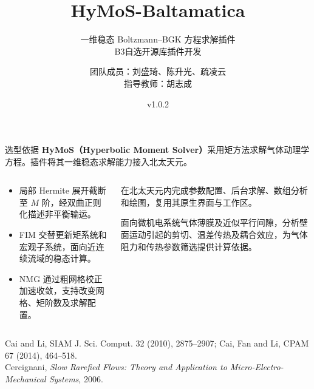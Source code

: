 \documentclass[aspectratio=1610]{ctexbeamer}
\title{HyMoS-Baltamatica}
\subtitle{\texorpdfstring{一维稳态 Boltzmann--BGK 方程求解插件\\[0.4em]
\normalsize B3\quad 自选开源库插件开发}{一维稳态 Boltzmann--BGK 方程求解插件}}
\author{\texorpdfstring{团队成员：刘盛琦、陈升光、疏凌云\\[0.5em]指导教师：胡志成}{刘盛琦、陈升光、疏凌云；指导教师：胡志成}}
\institute{南京航空航天大学}
\date{\small v1.0.2}
\newcommand{\refline}[1]{\par\vfill{\fontsize{7}{8.5}\selectfont\color{gray!85}#1}}
\newcommand{\subhead}[1]{\par\noindent{\color{structure.fg}\bfseries #1}\par\smallskip}
\begin{document}
\begin{frame}[plain]
\titlepage
\end{frame}

\begin{frame}{选型依据}
\textbf{HyMoS（Hyperbolic Moment Solver）}采用矩方法求解气体动理学方程。插件将其一维稳态求解能力接入北太天元。
\par\vspace{0.3cm}
\begin{columns}[T,onlytextwidth]
\begin{column}{0.49\textwidth}
\subhead{算法特点}
\begin{itemize}
\setlength\itemsep{0.6em}
\item 局部 Hermite 展开截断至 $M$ 阶，经双曲正则化描述非平衡输运。
\item FIM 交替更新矩系统和宏观子系统，面向近连续流域的稳态计算。
\item NMG 通过粗网格校正加速收敛，支持改变网格、矩阶数及求解配置。
\end{itemize}
\end{column}
\begin{column}{0.47\textwidth}
\subhead{接入价值}
在北太天元内完成参数配置、后台求解、数组分析和绘图，复用其原生界面与工作区。
\par\vspace{0.45cm}
\subhead{应用场景}
面向微机电系统气体薄膜及近似平行间隙，分析壁面运动引起的剪切、温差传热及耦合效应，为气体阻力和传热参数筛选提供计算依据。
\end{column}
\end{columns}
\refline{Cai and Li, SIAM J. Sci. Comput. 32 (2010), 2875--2907; Cai, Fan and Li, CPAM 67 (2014), 464--518.\\
Cercignani, \textit{Slow Rarefied Flows: Theory and Application to Micro-Electro-Mechanical Systems}, 2006.}
\end{frame}
\end{document}
